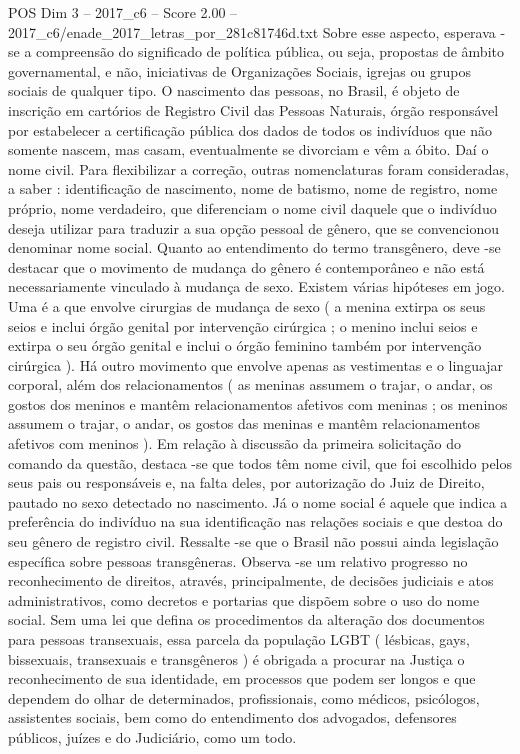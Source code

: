 \begin{textsample}{POS Dim 3 – 2017\_c6 – Score 2.00 – 2017\_c6/enade\_2017\_letras\_por\_281c81746d.txt}
Sobre esse aspecto, esperava -se a compreensão do significado de política pública, ou seja, propostas de âmbito governamental, e não, iniciativas de Organizações Sociais, igrejas ou grupos sociais de qualquer tipo.
O nascimento das pessoas, no Brasil, é objeto de inscrição em cartórios de Registro Civil das Pessoas Naturais, órgão responsável por estabelecer a certificação pública dos dados de todos os indivíduos que não somente nascem, mas casam, eventualmente se divorciam e vêm a óbito.
Daí o nome civil.
Para flexibilizar a correção, outras nomenclaturas foram consideradas, a saber : identificação de nascimento, nome de batismo, nome de registro, nome próprio, nome verdadeiro, que diferenciam o nome civil daquele que o indivíduo deseja utilizar para traduzir a sua opção pessoal de gênero, que se convencionou denominar nome social.
Quanto ao entendimento do termo transgênero, deve -se destacar que o movimento de mudança do gênero é contemporâneo e não está necessariamente vinculado à mudança de sexo.
Existem várias hipóteses em jogo.
Uma é a que envolve cirurgias de mudança de sexo ( a menina extirpa os seus seios e inclui órgão genital por intervenção cirúrgica ; o menino inclui seios e extirpa o seu órgão genital e inclui o órgão feminino também por intervenção cirúrgica ).
Há outro movimento que envolve apenas as vestimentas e o linguajar corporal, além dos relacionamentos ( as meninas assumem o trajar, o andar, os gostos dos meninos e mantêm relacionamentos afetivos com meninas ; os meninos assumem o trajar, o andar, os gostos das meninas e mantêm relacionamentos afetivos com meninos ).
Em relação à discussão da primeira solicitação do comando da questão, destaca -se que todos têm nome civil, que foi escolhido pelos seus pais ou responsáveis e, na falta deles, por autorização do Juiz de Direito, pautado no sexo detectado no nascimento.
Já o nome social é aquele que indica a preferência do indivíduo na sua identificação nas relações sociais e que destoa do seu gênero de registro civil.
Ressalte -se que o Brasil não possui ainda legislação específica sobre pessoas transgêneras.
Observa -se um relativo progresso no reconhecimento de direitos, através, principalmente, de decisões judiciais e atos administrativos, como decretos e portarias que dispõem sobre o uso do nome social.
Sem uma lei que defina os procedimentos da alteração dos documentos para pessoas transexuais, essa parcela da população LGBT ( lésbicas, gays, bissexuais, transexuais e transgêneros ) é obrigada a procurar na Justiça o reconhecimento de sua identidade, em processos que podem ser longos e que dependem do olhar de determinados, profissionais, como médicos, psicólogos, assistentes sociais, bem como do entendimento dos advogados, defensores públicos, juízes e do Judiciário, como um todo.

\end{textsample}
